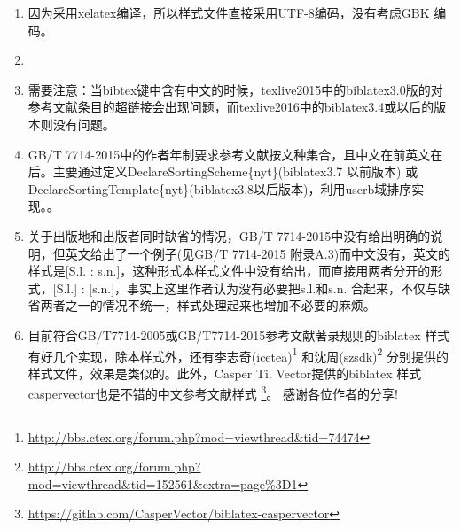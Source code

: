 \begin{enumerate}
  \item 因为采用xelatex编译，所以样式文件直接采用UTF-8编码，没有考虑GBK 编码。

  \item {}

  \item 需要注意：当bibtex键中含有中文的时候，texlive2015中的biblatex3.0版的对参考文献条目的超链接会出现问题，而texlive2016中的biblatex3.4或以后的版本则没有问题。

  \item GB/T 7714-2015中的作者年制要求参考文献按文种集合，且中文在前英文在后。主要通过定义DeclareSortingScheme\{nyt\}(biblatex3.7 以前版本) 或DeclareSortingTemplate\{nyt\}(biblatex3.8以后版本)，利用userb域排序实现。。


  \item 关于出版地和出版者同时缺省的情况，GB/T 7714-2015中没有给出明确的说明，但英文给出了一个例子(见GB/T 7714-2015 附录A.3)而中文没有，英文的样式是[S.l. : s.n.]，这种形式本样式文件中没有给出，而直接用两者分开的形式，[S.l.] : [s.n.]，事实上这里作者认为没有必要把s.l.和s.n. 合起来，不仅与缺省两者之一的情况不统一，样式处理起来也增加不必要的麻烦。

  \item 目前符合GB/T7714-2005或GB/T7714-2015参考文献著录规则的biblatex 样式有好几个实现，除本样式外，还有李志奇(icetea)\footnote{\url{http://bbs.ctex.org/forum.php?mod=viewthread&tid=74474}} 和沈周(szsdk)\footnote{\url{http://bbs.ctex.org/forum.php?mod=viewthread&tid=152561&extra=page\%3D1}} 分别提供的样式文件，效果是类似的。此外，Casper Ti. Vector提供的biblatex 样式caspervector也是不错的中文参考文献样式
      \footnote{\url{https://gitlab.com/CasperVector/biblatex-caspervector}}。 感谢各位作者的分享!


\end{enumerate}
